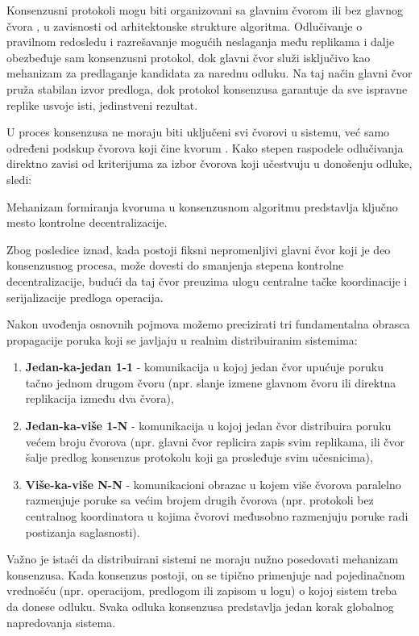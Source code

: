 Konsenzusni protokoli mogu biti organizovani sa glavnim čvorom  ili bez glavnog čvora , u zavisnosti od arhitektonske strukture algoritma. Odlučivanje o pravilnom redosledu i razrešavanje mogućih neslaganja među replikama i dalje obezbeđuje sam konsenzusni protokol, dok glavni čvor služi isključivo kao mehanizam za predlaganje kandidata za narednu odluku. Na taj način glavni čvor pruža stabilan izvor predloga, dok protokol konsenzusa garantuje da sve ispravne replike usvoje isti, jedinstveni rezultat.

U proces konsenzusa ne moraju biti uključeni svi čvorovi u sistemu, već samo određeni podskup čvorova koji čine kvorum . Kako stepen raspodele odlučivanja direktno zavisi od kriterijuma za izbor čvorova koji učestvuju u donošenju odluke, sledi:
\begin{posledica}
Mehanizam formiranja kvoruma u konsenzusnom algoritmu predstavlja ključno mesto kontrolne decentralizacije.
\end{posledica}

Zbog posledice iznad, kada postoji fiksni nepromenljivi glavni čvor koji je deo konsenzusnog procesa, može dovesti do smanjenja stepena kontrolne decentralizacije, budući da taj čvor preuzima ulogu centralne tačke koordinacije i serijalizacije predloga operacija.

Nakon uvođenja osnovnih pojmova možemo precizirati tri fundamentalna obrasca propagacije poruka koji se javljaju u realnim distribuiranim sistemima:
\begin{enumerate}
\item \textbf{Jedan-ka-jedan 1-1 } - komunikacija u kojoj jedan čvor upućuje poruku tačno jednom drugom čvoru (npr. slanje izmene glavnom čvoru ili direktna replikacija između dva čvora),
\item \textbf{Jedan-ka-više 1-N } - komunikacija u kojoj jedan čvor distribuira poruku većem broju čvorova (npr. glavni čvor replicira zapis svim replikama, ili čvor šalje predlog konsenzus protokolu koji ga prosleđuje svim učesnicima),
\item \textbf{Više-ka-više N-N } - komunikacioni obrazac u kojem više čvorova paralelno razmenjuje poruke sa većim brojem drugih čvorova (npr. protokoli bez centralnog koordinatora u kojima čvorovi međusobno razmenjuju poruke radi postizanja saglasnosti).
\end{enumerate}

Važno je istaći da distribuirani sistemi ne moraju nužno posedovati mehanizam konsenzusa. Kada konsenzus postoji, on se tipično primenjuje nad pojedinačnom vrednošću (npr. operacijom, predlogom ili zapisom u logu) o kojoj sistem treba da donese odluku. Svaka odluka konsenzusa predstavlja jedan korak globalnog napredovanja sistema.

